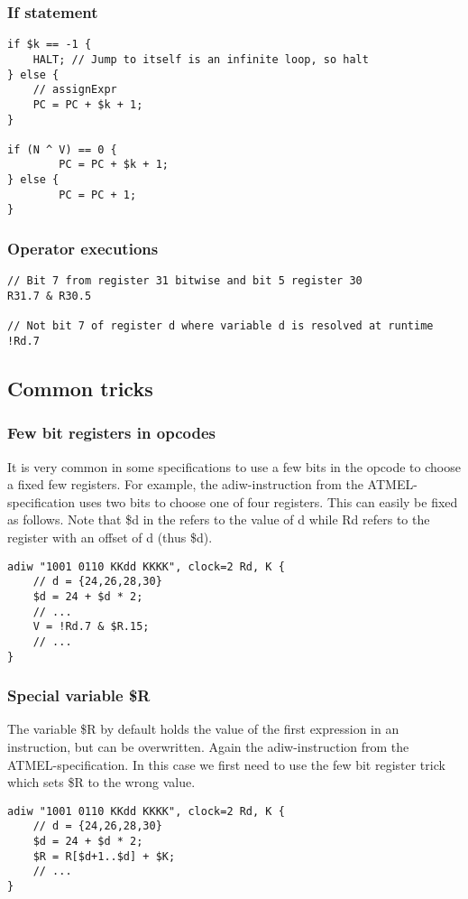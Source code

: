 \subsubsection{If statement}
\lstset{caption=If statement}
\begin{lstlisting}
if $k == -1 {
	HALT; // Jump to itself is an infinite loop, so halt
} else {
	// assignExpr
	PC = PC + $k + 1;
}

if (N ^ V) == 0 {
		PC = PC + $k + 1;
} else {
		PC = PC + 1;
}
\end{lstlisting}

\subsubsection{Operator executions}
\lstset{caption=Operator expressions}
\begin{lstlisting}
// Bit 7 from register 31 bitwise and bit 5 register 30
R31.7 & R30.5

// Not bit 7 of register d where variable d is resolved at runtime
!Rd.7
\end{lstlisting}

\subsection{Common tricks}
\subsubsection{Few bit registers in opcodes}
It is very common in some specifications to use a few bits in the opcode to
choose a fixed few registers. For example, the adiw-instruction from the
ATMEL-specification uses two bits to choose one of four registers. This can
easily be fixed as follows. Note that \$d in the refers to the value of d while
Rd refers to the register with an offset of d (thus \$d).

\lstset{caption=Two-bit register variable in opcodes}
\begin{lstlisting}
adiw "1001 0110 KKdd KKKK", clock=2 Rd, K {
	// d = {24,26,28,30}
	$d = 24 + $d * 2;
	// ...
	V = !Rd.7 & $R.15;
	// ...
}
\end{lstlisting}

\subsubsection{Special variable \$R}
The variable \$R by default holds the value of the first expression in an
instruction, but can be overwritten. Again the adiw-instruction from the
ATMEL-specification. In this case we first need to use the few bit register
trick which sets \$R to the wrong value.

\lstset{caption=Special variable \$R}
\begin{lstlisting}
adiw "1001 0110 KKdd KKKK", clock=2 Rd, K {
	// d = {24,26,28,30}
	$d = 24 + $d * 2;
	$R = R[$d+1..$d] + $K;
	// ...
}
\end{lstlisting}
